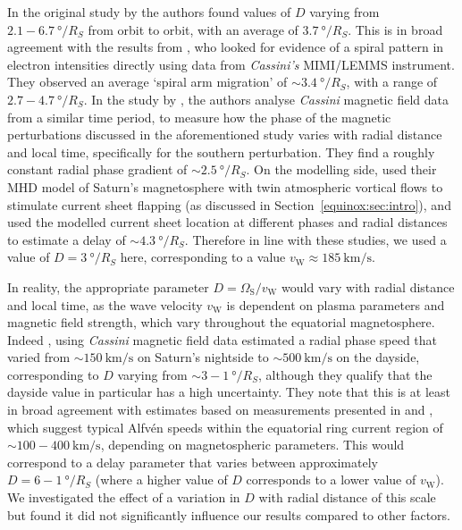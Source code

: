 In the original study by \citet{arridge2011} the authors found values of $D$ varying from $2.1-\SI{6.7}{\degree/R_S}$ from orbit to orbit, with an average of $\SI{3.7}{\degree/R_S}$. This is in broad agreement with the results from \citet{carbary2007}, who looked for evidence of a spiral pattern in electron intensities directly using data from \textit{Cassini's} MIMI/LEMMS instrument. They observed an average `spiral arm migration' of ${{\sim}}\SI{3.4}{\degree/R_S}$, with a range of $2.7-\SI{4.7}{\degree/R_S}$. In the study by \citet{provan2012}, the authors analyse \textit{Cassini} magnetic field data from a similar time period, to measure how the phase of the magnetic perturbations discussed in the aforementioned \citet{andrews2012} study varies with radial distance and local time, specifically for the southern perturbation. They find a roughly constant radial phase gradient of ${{\sim}}\SI{2.5}{\degree/R_S}$. On the modelling side, \citet{jiaandkivelson2012} used their MHD model of Saturn's magnetosphere with twin atmospheric vortical flows to stimulate current sheet flapping (as discussed in Section~\ref{equinox:sec:intro}), and used the modelled current sheet location at different phases and radial distances to estimate a delay of ${\sim}\SI{4.3}{\degree/R_S}$. Therefore in line with these studies, we used a value of $D = \SI{3}{\degree/R_S}$ here, corresponding to a value $v_\mathrm{W} \approx \SI{185}{\km\per\second}$.

In reality, the appropriate parameter $D = \Omega_\mathrm{S}/v_\mathrm{W}$ would vary with radial distance and local time, as the wave velocity $v_\mathrm{W}$ is dependent on plasma parameters and magnetic field strength, which vary throughout the equatorial magnetosphere. Indeed \citet{andrews2010}, using \textit{Cassini} magnetic field data estimated a radial phase speed that varied from ${\sim}\SI{150}{\km\per\second}$ on Saturn's nightside to ${\sim}\SI{500}{\km\per\second}$ on the dayside, corresponding to $D$ varying from ${\sim}3-\SI{1}{\degree/R_S}$, although they qualify that the dayside value in particular has a high uncertainty. They note that this is at least in broad agreement with estimates based on measurements presented in \citet{wilson2008} and \citet{mcandrews2009}, which suggest typical Alfv\'{e}n speeds within the equatorial ring current region of ${\sim}100-\SI{400}{\km\per\second}$, depending on magnetospheric parameters. This would correspond to a delay parameter that varies between approximately $D = 6-\SI{1}{\degree/R_S}$ (where a higher value of $D$ corresponds to a lower value of $v_\mathrm{W}$). We investigated the effect of a variation in $D$ with radial distance of this scale but found it did not significantly influence our results compared to other factors. %

